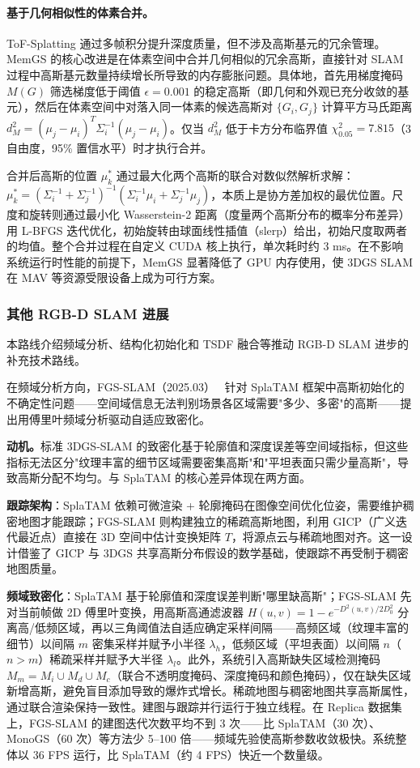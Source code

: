 \paragraph{基于几何相似性的体素合并。}ToF-Splatting 通过多帧积分提升深度质量，但不涉及高斯基元的冗余管理。MemGS 的核心改进是在体素空间中合并几何相似的冗余高斯，直接针对 SLAM 过程中高斯基元数量持续增长所导致的内存膨胀问题。具体地，首先用梯度掩码 $M(G)$ 筛选梯度低于阈值 $\epsilon = 0.001$ 的稳定高斯（即几何和外观已充分收敛的基元），然后在体素空间中对落入同一体素的候选高斯对 $\{G_i, G_j\}$ 计算平方马氏距离 $d_M^2 = (\mu_j - \mu_i)^T \Sigma_i^{-1}(\mu_j - \mu_i)$。仅当 $d_M^2$ 低于卡方分布临界值 $\chi^2_{0.05} = 7.815$（3 自由度，95\% 置信水平）时才执行合并。

合并后高斯的位置 $\mu_k^*$ 通过最大化两个高斯的联合对数似然解析求解：$\mu_k^* = (\Sigma_i^{-1} + \Sigma_j^{-1})^{-1}(\Sigma_i^{-1}\mu_i + \Sigma_j^{-1}\mu_j)$，本质上是协方差加权的最优位置。尺度和旋转则通过最小化 Wasserstein-2 距离（度量两个高斯分布的概率分布差异）用 L-BFGS 迭代优化，初始旋转由球面线性插值（slerp）给出，初始尺度取两者的均值。整个合并过程在自定义 CUDA 核上执行，单次耗时约 3 ms。在不影响系统运行时性能的前提下，MemGS 显著降低了 GPU 内存使用，使 3DGS SLAM 在 MAV 等资源受限设备上成为可行方案。

\subsubsection{其他 RGB-D SLAM 进展}

本路线介绍频域分析、结构化初始化和 TSDF 融合等推动 RGB-D SLAM 进步的补充技术路线。

在频域分析方向，FGS-SLAM（2025.03）~\cite{2503_01109} 针对 SplaTAM 框架中高斯初始化的不确定性问题——空间域信息无法判别场景各区域需要"多少、多密"的高斯——提出用傅里叶频域分析驱动自适应致密化。

\textbf{动机。}标准 3DGS-SLAM 的致密化基于轮廓值和深度误差等空间域指标，但这些指标无法区分"纹理丰富的细节区域需要密集高斯"和"平坦表面只需少量高斯"，导致高斯分配不均匀。与 SplaTAM 的核心差异体现在两方面。

\textbf{跟踪架构}：SplaTAM 依赖可微渲染 + 轮廓掩码在图像空间优化位姿，需要维护稠密地图才能跟踪；FGS-SLAM 则构建独立的稀疏高斯地图，利用 GICP（广义迭代最近点）直接在 3D 空间中估计变换矩阵 $T$，将源点云与稀疏地图对齐。这一设计借鉴了 GICP 与 3DGS 共享高斯分布假设的数学基础，使跟踪不再受制于稠密地图质量。

\textbf{频域致密化}：SplaTAM 基于轮廓值和深度误差判断"哪里缺高斯"；FGS-SLAM 先对当前帧做 2D 傅里叶变换，用高斯高通滤波器 $H(u,v) = 1 - e^{-D^2(u,v)/2D_0^2}$ 分离高/低频区域，再以三角阈值法自适应确定采样间隔——高频区域（纹理丰富的细节）以间隔 $m$ 密集采样并赋予小半径 $\lambda_h$，低频区域（平坦表面）以间隔 $n$（$n > m$）稀疏采样并赋予大半径 $\lambda_l$。此外，系统引入高斯缺失区域检测掩码 $M_m = M_i \cup M_d \cup M_c$（联合不透明度掩码、深度掩码和颜色掩码），仅在缺失区域新增高斯，避免盲目添加导致的爆炸式增长。稀疏地图与稠密地图共享高斯属性，通过联合渲染保持一致性。建图与跟踪并行运行于独立线程。在 Replica 数据集上，FGS-SLAM 的建图迭代次数平均不到 3 次——比 SplaTAM（30 次）、MonoGS（60 次）等方法少 5--100 倍——频域先验使高斯参数收敛极快。系统整体以 36 FPS 运行，比 SplaTAM（约 4 FPS）快近一个数量级。

